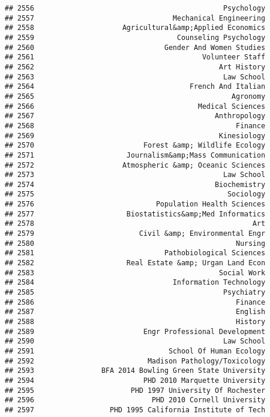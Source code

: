 \documentclass[
]{article}
\begin{document}
\begin{verbatim}
## 2556                                             Psychology
## 2557                                 Mechanical Engineering
## 2558                     Agricultural&amp;Applied Economics
## 2559                                  Counseling Psychology
## 2560                               Gender And Women Studies
## 2561                                        Volunteer Staff
## 2562                                            Art History
## 2563                                             Law School
## 2564                                     French And Italian
## 2565                                               Agronomy
## 2566                                       Medical Sciences
## 2567                                           Anthropology
## 2568                                                Finance
## 2569                                            Kinesiology
## 2570                          Forest &amp; Wildlife Ecology
## 2571                      Journalism&amp;Mass Communication
## 2572                     Atmospheric &amp; Oceanic Sciences
## 2573                                             Law School
## 2574                                           Biochemistry
## 2575                                              Sociology
## 2576                             Population Health Sciences
## 2577                      Biostatistics&amp;Med Informatics
## 2578                                                    Art
## 2579                         Civil &amp; Environmental Engr
## 2580                                                Nursing
## 2581                               Pathobiological Sciences
## 2582                      Real Estate &amp; Urgan Land Econ
## 2583                                            Social Work
## 2584                                 Information Technology
## 2585                                             Psychiatry
## 2586                                                Finance
## 2587                                                English
## 2588                                                History
## 2589                          Engr Professional Development
## 2590                                             Law School
## 2591                                School Of Human Ecology
## 2592                           Madison Pathology/Toxicology
## 2593                BFA 2014 Bowling Green State University
## 2594                          PHD 2010 Marquette University
## 2595                       PHD 1997 University Of Rochester
## 2596                            PHD 2010 Cornell University
## 2597                  PHD 1995 California Institute of Tech

\end{verbatim}
\end{document}
